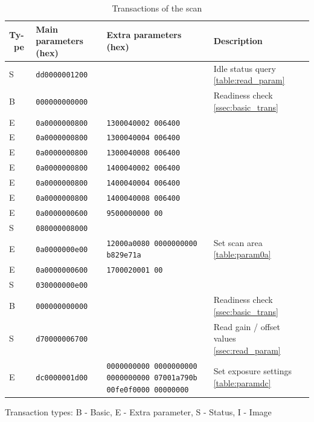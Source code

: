 \documentclass{article}
\begin{document}
\begin{table}[H]
  \caption{Transactions of the scan}
  \centering
  \begin{tabular}{p{0.4cm} | p{2.3cm} | p{2cm} | p{5cm}}
    Ty-\ pe & Main parameters (hex) & Extra parameters (hex) & Description \\ \hline
    S & {\tt dd0000001200} &  & Idle status query \autoref{table:read_param} \\
    B & {\tt 000000000000} &  & Readiness check \ref{ssec:basic_trans} \\
    E & {\tt 0a0000000800} & \tt 1300040002 006400 & \\
    E & {\tt 0a0000000800} & \tt 1300040004 006400 & \\
    E & {\tt 0a0000000800} & \tt 1300040008 006400 & \\
    E & {\tt 0a0000000800} & \tt 1400040002 006400 & \\
    E & {\tt 0a0000000800} & \tt 1400040004 006400 & \\
    E & {\tt 0a0000000800} & \tt 1400040008 006400 & \\
    E & {\tt 0a0000000600} & \tt 9500000000 00 & \\
    S & {\tt 080000008000} &  & \\
    E & {\tt 0a0000000e00} & \tt 12000a0080 0000000000 b829e71a & Set scan area \autoref{table:param0a} \\
    E & {\tt 0a0000000600} & \tt 1700020001 00 & \\
    S & {\tt 030000000e00} &  & \\
    B & {\tt 000000000000} &  & Readiness check \ref{ssec:basic_trans} \\
    S & {\tt d70000006700} &  & Read gain / offset values \ref{ssec:read_param} \\
    E & {\tt dc0000001d00} & \tt 0000000000 0000000000 0000000000 07001a790b 00fe0f0000 00000000
                           & Set exposure settings \autoref{table:paramdc} \\
  \end{tabular}
  
  \vspace{5mm} Transaction types: B - Basic, E - Extra parameter,
               S - Status, I - Image
\end{table}
\end{document}
